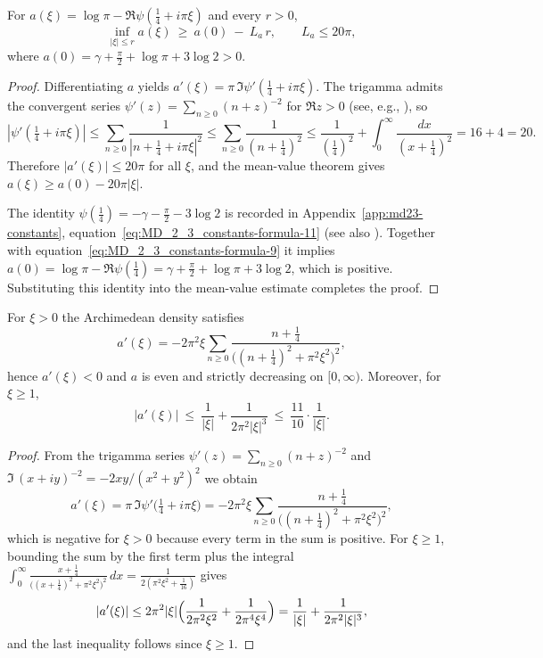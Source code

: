 \begin{lemma}\label{lem:a3-core-slope}
For $a(\xi)=\log\pi-\Re\psi(\tfrac14+i\pi\xi)$ and every $r>0$,
\[
  \inf_{|\xi|\le r} a(\xi)\ \ge\ a(0)\ -\ L_a\,r,
  \qquad L_a \le 20\pi,
\]
where
\(
  a(0)=\gamma + \frac{\pi}{2} + \log\pi + 3\log 2 > 0
\).
\end{lemma}
\begin{proof}
Differentiating $a$ yields
$a'(\xi) = \pi\,\Im\psi'(\tfrac14+i\pi\xi)$.
The trigamma admits the convergent series
\(
  \psi'(z)=\sum_{n\ge0}(n+z)^{-2}
\)
for $\Re z>0$ (see, e.g., \cite[Ch.~2]{Titchmarsh1986}), so
\[
  |\psi'(\tfrac14+i\pi\xi)|
  \le \sum_{n\ge0} \frac{1}{|n+\tfrac14+i\pi\xi|^2}
  \le \sum_{n\ge0} \frac{1}{(n+\tfrac14)^2}
  \le \frac{1}{(\tfrac14)^2} + \int_{0}^{\infty} \frac{dx}{(x+\tfrac14)^2}
  = 16 + 4 = 20.
\]
Therefore $|a'(\xi)|\le 20\pi$ for all $\xi$, and the mean-value theorem gives
$a(\xi)\ge a(0)-20\pi|\xi|$.

The identity
\(
  \psi(\tfrac14) = -\gamma - \tfrac{\pi}{2} - 3\log 2
\)
is recorded in Appendix~\ref{app:md23-constants}, equation~\eqref{eq:MD_2_3_constants-formula-11} (see also \cite[Ch.~2]{Titchmarsh1986}). Together with equation~\eqref{eq:MD_2_3_constants-formula-9} it implies
$a(0)=\log\pi-\Re\psi(\tfrac14)=\gamma+\tfrac{\pi}{2}+\log\pi+3\log 2$, which is positive. Substituting this identity into the mean-value estimate completes the proof.
\end{proof}

\begin{lemma}\label{lem:a3-a-monotone}
For $\xi>0$ the Archimedean density satisfies
\[
  a'(\xi)
  = -2\pi^2\xi\sum_{n\ge0}\frac{n+\tfrac14}{\bigl((n+\tfrac14)^2+\pi^2\xi^2\bigr)^2},
\]
hence $a'(\xi)<0$ and $a$ is even and strictly decreasing on $[0,\infty)$.
Moreover, for $\xi\ge 1$,
\[
  |a'(\xi)| \ \le\ \frac{1}{|\xi|}+\frac{1}{2\pi^2|\xi|^3}
  \ \le\ \frac{11}{10}\cdot\frac{1}{|\xi|}.
\]
\end{lemma}
\begin{proof}
From the trigamma series
\(
  \psi'(z)=\sum_{n\ge0}(n+z)^{-2}
\)
and $\Im\,(x+iy)^{-2}=-2xy/(x^2+y^2)^2$ we obtain
\[
  a'(\xi)=\pi\,\Im\psi'\bigl(\tfrac14+i\pi\xi\bigr)
  = -2\pi^2\xi\sum_{n\ge0}\frac{n+\tfrac14}{\bigl((n+\tfrac14)^2+\pi^2\xi^2\bigr)^2},
\]
which is negative for $\xi>0$ because every term in the sum is positive.
For $\xi\ge1$, bounding the sum by the first term plus the integral
\(
  \int_{0}^{\infty}\frac{x+\tfrac14}{\bigl((x+\tfrac14)^2+\pi^2\xi^2\bigr)^2}\,dx
  = \frac{1}{2(\pi^2\xi^2+\tfrac{1}{16})}
\)
gives
\[
  |a'(\xi)|\le 2\pi^2|\xi|\Bigl(\frac{1}{2\pi^2\xi^2}+\frac{1}{2\pi^4\xi^4}\Bigr)
  = \frac{1}{|\xi|}+\frac{1}{2\pi^2|\xi|^3},
\]
and the last inequality follows since $\xi\ge1$.
\end{proof}

